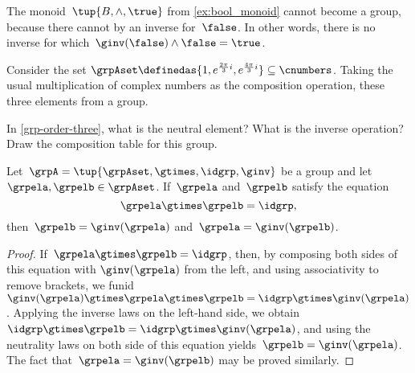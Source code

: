 \begin{example}
  The monoid~$\tup{B,\wedge, \true}$ from \cref{ex:bool_monoid} cannot become a group, because there cannot by an inverse for~$\false$. In other words, there is no inverse for which~$\ginv(\false)\wedge \false=\true$.
\end{example}
\begin{example}
  \label{grp-order-three}
  Consider the set $\grpAset \definedas \{ 1, e^{\frac{2\pi}{3} i}, e^{\frac{4\pi }{3}i}  \} \subseteq \cnumbers$.
  Taking the usual multiplication of complex numbers as the composition operation, these three elements from a group.
\end{example}

\begin{gradedexercise}\label{ex:GroupWithThreeElements}
  In \cref{grp-order-three}, what is the neutral element? What is the inverse operation?
  Draw the composition table for this group.
\end{gradedexercise}


\begin{lemma}
 \label{lem:inv-op-unique}
Let~$\grpA = \tup{ \grpAset, \gtimes, \idgrp, \ginv }$ be a group and let~$\grpela, \grpelb \in \grpAset$. If~$\grpela$ and~$\grpelb$ satisfy the equation
\begin{equation}
\grpela \gtimes \grpelb = \idgrp,
\end{equation}
then~$\grpelb = \ginv( \grpela )$ and~$\grpela = \ginv(\grpelb)$.
\end{lemma}

\begin{proof}
If~$\grpela \gtimes \grpelb = \idgrp$, then, by composing both sides of this equation with $\ginv(\grpela)$ from the left, and using associativity to remove brackets, we funid~$\ginv(\grpela) \gtimes \grpela \gtimes \grpelb = \idgrp \gtimes \ginv(\grpela)$.
Applying the inverse laws on the left-hand side, we obtain~$\idgrp \gtimes \grpelb = \idgrp \gtimes \ginv(\grpela)$, and using the neutrality laws on both side of this equation yields~$\grpelb =  \ginv(\grpela)$.
The fact that~$\grpela = \ginv(\grpelb)$ may be proved similarly.
\end{proof}


